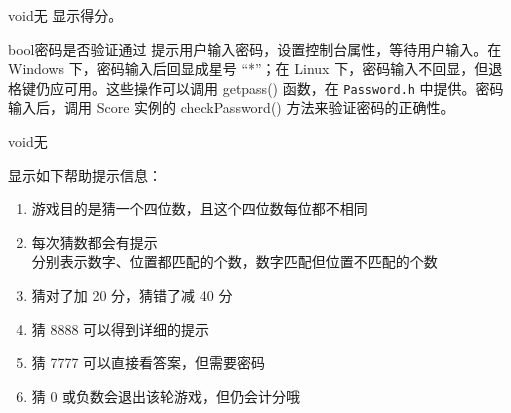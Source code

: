 {}
{void}{无}
{显示得分。}

{}
{bool}{密码是否验证通过}
{提示用户输入密码，设置控制台属性，等待用户输入。在 Windows 下，密码输入后回显成星号 “*”；在 Linux 下，密码输入不回显，但退格键仍应可用。这些操作可以调用 getpass() 函数，在 {\tt Password.h} 中提供。密码输入后，调用 Score 实例的 checkPassword() 方法来验证密码的正确性。}

{}
{void}{无}
{显示如下帮助提示信息：
\begin{enumerate}
\item 游戏目的是猜一个四位数，且这个四位数每位都不相同
\item 每次猜数都会有提示\\
   分别表示数字、位置都匹配的个数，数字匹配但位置不匹配的个数
\item 猜对了加 20 分，猜错了减 40 分
\item 猜 8888 可以得到详细的提示
\item 猜 7777 可以直接看答案，但需要密码
\item 猜 0 或负数会退出该轮游戏，但仍会计分哦
\end{enumerate}
}
